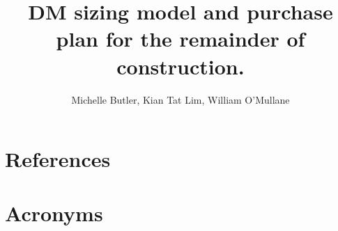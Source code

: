 \documentclass[DM,authoryear,toc]{lsstdoc}
\title{DM sizing model and purchase plan for the remainder of construction.}
\author{%
Michelle Butler, Kian Tat Lim, William O'Mullane
}
\date{\vcsDate}
\begin{document}
\mkshorttitle



\appendix
\section{References} \label{sec:bib}


\section{Acronyms} \label{sec:acronyms}

\end{document}
